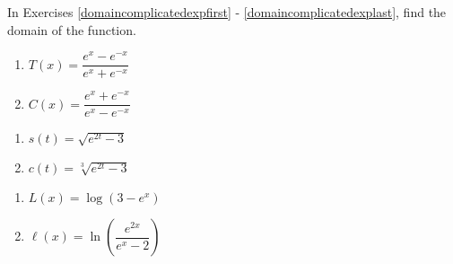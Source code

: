 \documentclass{ximera}
\begin{document}
\pagebreak

In Exercises \ref{domaincomplicatedexpfirst} - \ref{domaincomplicatedexplast},  find the domain of the function.

\begin{multicols}{2} 
\begin{enumerate}
\setcounter{enumi}{\value{HW}}

\item  $T(x) = \dfrac{e^{x} - e^{-x}}{e^{x} + e^{-x}}$     \label{domaincomplicatedexpfirst}

\item   $C(x) = \dfrac{e^{x}  + e^{-x}}{e^{x}  - e^{-x}}$ 

\setcounter{HW}{\value{enumi}}
\end{enumerate}
\end{multicols}


\begin{multicols}{2} 
\begin{enumerate}
\setcounter{enumi}{\value{HW}}

\item     $s(t) = \sqrt{e^{2t} - 3}$
\item     $c(t) = \sqrt[3]{e^{2t} - 3}$

\setcounter{HW}{\value{enumi}}
\end{enumerate}
\end{multicols}

\begin{multicols}{2} 
\begin{enumerate}
\setcounter{enumi}{\value{HW}}
  
\item     $L(x) = \log\left( 3 - e^{x} \right)$  

\item    $\ell(x) = \ln\left( \dfrac{e^{2x}}{e^{x}-2} \right)$  \label{domaincomplicatedexplast}

\setcounter{HW}{\value{enumi}}
\end{enumerate}
\end{multicols}
\end{document}
